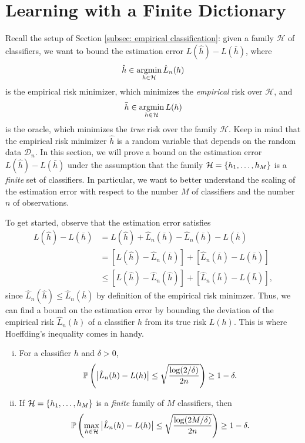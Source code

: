 \section{Learning with a Finite Dictionary}

Recall the setup of Section \ref{subsec: empirical classification}: given a family $\mathcal{H}$ of classifiers, we want to bound the estimation error $L(\hat h) - L(\bar h)$, where
\[
    \hat h \in \operatorname*{argmin}_{h \in \mathcal{H}} \hat L_n(h)
\]
is the empirical risk minimizer, which minimizes the \emph{empirical} risk over $\mathcal{H}$, and
\[
    \bar h \in \operatorname*{argmin}_{h \in \mathcal{H}} L(h)
\]
is the oracle, which minimizes the \emph{true} risk over the family $\mathcal{H}$. Keep in mind that the empirical risk minimizer $\hat h$ is a random variable that depends on the random data $\mathcal{D}_n$. In this section, we will prove a bound on the estimation error $L(\hat h) - L(\bar h)$ under the assumption that the family $\mathcal{H} = \left\{h_1, \dots, h_M\right\}$ is a \emph{finite} set of classifiers. In particular, we want to better understand the scaling of the estimation error with respect to the number $M$ of classifiers and the number $n$ of observations.

To get started, observe that the estimation error satisfies
\begin{align*}
    L(\hat h) - L(\bar h) &= L(\hat h) + \hat L_n(\bar h) - \hat L_n(\bar h) - L(\bar h) \\
        &= \left[L(\hat h) - \hat L_n(\bar h)\right] + \left[\hat L_n(\bar h) - L(\bar h)\right] \\
        &\leq \left[L(\hat h) - \hat L_n(\hat h)\right] + \left[\hat L_n(\bar h) - L(\bar h)\right],
\end{align*}
since $\hat L_n(\hat h) \leq \hat L_n(\bar h)$ by definition of the empirical risk minimzer. Thus, we can find a bound on the estimation error by bounding the deviation of the empirical risk $\hat L_n(h)$ of a classifier $h$ from its true risk $L(h)$. This is where Hoeffding's inequality comes in handy.

\begin{theorem}
\label{thm: empirical vs true risk}
\begin{enumerate}[(i)]
    \item For a classifier $h$ and $\delta > 0$,
    \[
        \mathbb{P}\left(\big\lvert \hat L_n(h) - L(h) \big\rvert \leq \sqrt{\frac{\log(2/\delta)}{2n}}\right) \geq 1 - \delta.
    \]

    \item If $\mathcal{H} = \left\{h_1, \dots, h_M\right\}$ is a \emph{finite} family of $M$ classifiers, then
    \[
        \mathbb{P}\left(\max_{h \in \mathcal{H}} \big\lvert \hat L_n(h) - L(h) \big\rvert \leq \sqrt{\frac{\log(2M/\delta)}{2n}}\right) \geq 1 - \delta.
    \]
\end{enumerate}
\end{theorem}

